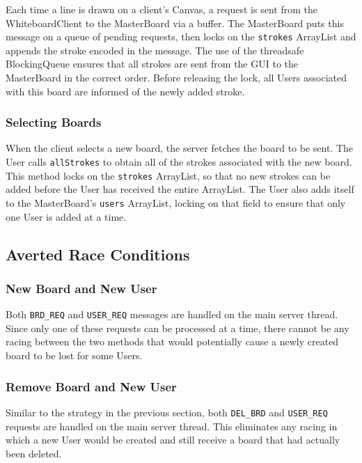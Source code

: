 Each time a line is drawn on a client's Canvas, a request is sent from the WhiteboardClient to the MasterBoard via a buffer. The MasterBoard puts this message on a queue of pending requests, then locks on the \texttt{strokes} ArrayList and appends the stroke encoded in the message. The use of the threadsafe BlockingQueue ensures that all strokes are sent from the GUI to the MasterBoard in the correct order. Before releasing the lock, all Users associated with this board are informed of the newly added stroke.

\subsubsection{Selecting Boards}

When the client selects a new board, the server fetches the board to be sent. The User calls \texttt{allStrokes} to obtain all of the strokes associated with the new board. This method locks on the \texttt{strokes} ArrayList, so that no new strokes can be added before the User has received the entire ArrayList. The User also adds itself to the MasterBoard's \texttt{users} ArrayList, locking on that field to ensure that only one User is added at a time.

\subsection{Averted Race Conditions}

\subsubsection{New Board and New User}

Both \texttt{BRD\_REQ} and \texttt{USER\_REQ} messages are handled on the main server thread. Since only one of these requests can be processed at a time, there cannot be any racing between the two methods that would potentially cause a newly created board to be lost for some Users. 

\subsubsection{Remove Board and New User}

Similar to the strategy in the previous section, both \texttt{DEL\_BRD} and \texttt{USER\_REQ} requests are handled on the main server thread. This eliminates any racing in which a new User would be created and still receive a board that had actually been deleted.

